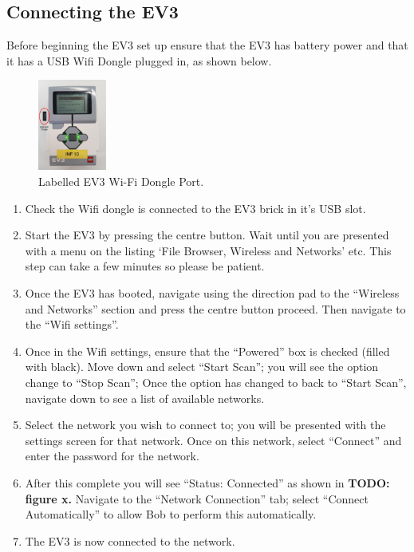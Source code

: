 \documentclass[onecolumn]{IEEEtran}
\begin{document}
\subsection{Connecting the EV3}
Before beginning the EV3 set up ensure that the EV3 has battery power and that it has a USB Wifi Dongle plugged in, as shown below.
\begin{figure}[H]
    \center
    \includegraphics[width=0.2\textwidth]{ev3.png}
    \caption{Labelled EV3 Wi-Fi Dongle Port.}
    \label{fig: figure}
\end{figure}
\begin{enumerate}
    \item Check the Wifi dongle is connected to the EV3 brick in it’s USB slot. 
    \item Start the EV3 by pressing the centre button. Wait until you are presented with a menu on the listing ‘File Browser, Wireless and Networks’ etc. This step can take a few minutes so please be patient. 
    \item Once the EV3 has booted, navigate using the direction pad to the “Wireless and Networks” section and press the centre button proceed. Then navigate to the “Wifi settings”.
    \item Once in the Wifi settings, ensure that the “Powered” box is checked (filled with black). Move down and select “Start Scan”; you will see the option change to “Stop Scan”; Once the option has changed to back to “Start Scan”, navigate down to see a list of available networks.
    \item Select the network you wish to connect to; you will be presented with the settings screen for that network. Once on this network, select “Connect” and enter the password for the network. \item After this complete you will see “Status: Connected” as shown in \textbf{TODO: figure x.} Navigate to the “Network Connection” tab; select “Connect Automatically” to allow Bob to perform this automatically. 
    \item The EV3 is now connected to the network. 
\end{enumerate}
\end{document}
